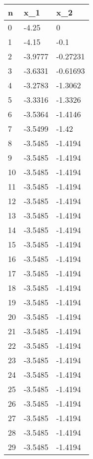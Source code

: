 \begin{tabular}{lll}
n & x_{1} & x_{2} \\ 
\hline 
0 & -4.25 & 0 \\ 
1 & -4.15 & -0.1 \\ 
2 & -3.9777 & -0.27231 \\ 
3 & -3.6331 & -0.61693 \\ 
4 & -3.2783 & -1.3062 \\ 
5 & -3.3316 & -1.3326 \\ 
6 & -3.5364 & -1.4146 \\ 
7 & -3.5499 & -1.42 \\ 
8 & -3.5485 & -1.4194 \\ 
9 & -3.5485 & -1.4194 \\ 
10 & -3.5485 & -1.4194 \\ 
11 & -3.5485 & -1.4194 \\ 
12 & -3.5485 & -1.4194 \\ 
13 & -3.5485 & -1.4194 \\ 
14 & -3.5485 & -1.4194 \\ 
15 & -3.5485 & -1.4194 \\ 
16 & -3.5485 & -1.4194 \\ 
17 & -3.5485 & -1.4194 \\ 
18 & -3.5485 & -1.4194 \\ 
19 & -3.5485 & -1.4194 \\ 
20 & -3.5485 & -1.4194 \\ 
21 & -3.5485 & -1.4194 \\ 
22 & -3.5485 & -1.4194 \\ 
23 & -3.5485 & -1.4194 \\ 
24 & -3.5485 & -1.4194 \\ 
25 & -3.5485 & -1.4194 \\ 
26 & -3.5485 & -1.4194 \\ 
27 & -3.5485 & -1.4194 \\ 
28 & -3.5485 & -1.4194 \\ 
29 & -3.5485 & -1.4194 \\ 
\hline 
\end{tabular}